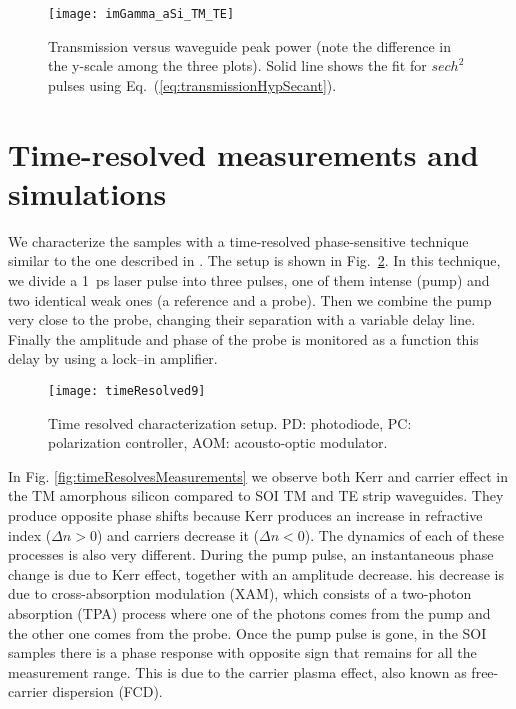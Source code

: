 \begin{figure}[htb]
    \centering
    \texttt{[image: imGamma\_aSi\_TM\_TE]}
      \caption{Transmission versus waveguide peak power (note the difference in the y-scale among the three plots). Solid line shows the fit for $ sech^2 $ pulses using Eq.~(\ref{eq:transmissionHypSecant}).}
    \label{fig:imGammaSamples}
\end{figure}



\section{Time-resolved measurements and simulations}
We characterize the samples with a time-resolved phase-sensitive technique similar to the one described in \cite{Vallaitis2008}.
The setup is shown in Fig.~\ref{fig:setupTimeRes}. In this technique, we divide a 1~ps laser pulse into three pulses, one of them intense (pump) and two identical weak ones (a reference and a probe).
Then we combine the pump very close to the probe, changing their separation with a variable delay line.
Finally the amplitude and phase of the probe is monitored as a function this delay by using a lock--in amplifier.

\begin{figure}[htb]
    \centering
    \texttt{[image: timeResolved9]}
    \caption{Time resolved characterization setup. PD: photodiode, PC: polarization controller, AOM: acousto-optic modulator.}
    \label{fig:setupTimeRes}
\end{figure}


In Fig. \ref{fig:timeResolvesMeasurements} we observe both Kerr and carrier effect in the TM amorphous silicon compared to SOI TM and TE strip waveguides.
They produce opposite phase shifts because Kerr produces an increase in refractive index ($ \Delta n > 0 $) and carriers decrease it ($ \Delta n < 0 $).
The dynamics of each of these processes is also very different. During the pump pulse, an instantaneous phase change is due to Kerr effect, together with an amplitude decrease.
his decrease is due to cross-absorption modulation (XAM), which consists of a two-photon absorption (TPA) process where one of the photons comes from the pump and the other one comes from the probe. Once the pump pulse is gone, in the SOI samples there is a phase response with opposite sign that remains for all the measurement range.
This is due to the carrier plasma effect, also known as free-carrier dispersion (FCD). 


